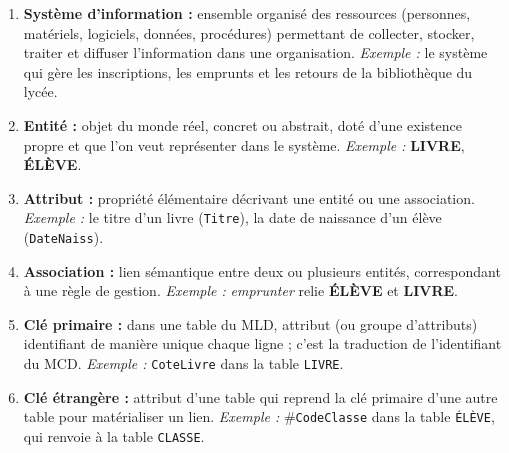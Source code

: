 \documentclass[11pt]{article}
\begin{document}
\begin{corrige}
\begin{enumerate}
  \item \textbf{Système d'information :} ensemble organisé des ressources (personnes, matériels, logiciels, données, procédures) permettant de collecter, stocker, traiter et diffuser l'information dans une organisation. \emph{Exemple :} le système qui gère les inscriptions, les emprunts et les retours de la bibliothèque du lycée.
  \item \textbf{Entité :} objet du monde réel, concret ou abstrait, doté d'une existence propre et que l'on veut représenter dans le système. \emph{Exemple :} \textbf{LIVRE}, \textbf{ÉLÈVE}.
  \item \textbf{Attribut :} propriété élémentaire décrivant une entité ou une association. \emph{Exemple :} le titre d'un livre (\texttt{Titre}), la date de naissance d'un élève (\texttt{DateNaiss}).
  \item \textbf{Association :} lien sémantique entre deux ou plusieurs entités, correspondant à une règle de gestion. \emph{Exemple :} \emph{emprunter} relie \textbf{ÉLÈVE} et \textbf{LIVRE}.
  \item \textbf{Clé primaire :} dans une table du MLD, attribut (ou groupe d'attributs) identifiant de manière unique chaque ligne ; c'est la traduction de l'identifiant du MCD. \emph{Exemple :} \texttt{CoteLivre} dans la table \texttt{LIVRE}.
  \item \textbf{Clé étrangère :} attribut d'une table qui reprend la clé primaire d'une autre table pour matérialiser un lien. \emph{Exemple :} \#\texttt{CodeClasse} dans la table \texttt{ÉLÈVE}, qui renvoie à la table \texttt{CLASSE}.
\end{enumerate}
\end{corrige}
\end{document}
